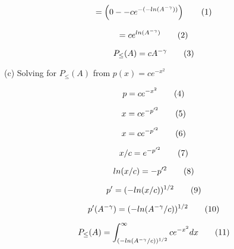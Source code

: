 \[
  =
  \left(
    0
      -
    -ce^{-(-ln(A^{-\gamma}))}
  \right)
  \addtag
\]

\[
  =
  ce^{ln(A^{-\gamma})}
  \addtag
\]

\[
  P_\leq (A)
  =
  cA^{-\gamma}
  \addtag
\]

(c) Solving for
$P_\leq (A)$
from
$p(x) = ce^{-x^2}$

\[
  p = ce^{-x^2}
  \addtag
\]

\[
  x = ce^{-p'^2}
  \addtag
\]

\[
  x = ce^{-p'^2}
  \addtag
\]

\[
  x / c
  =
  e^{-p'^2}
  \addtag
\]

\[
  ln(x / c)
  =
  -p'^2
  \addtag
\]

\[
  p'
  =
  (-ln(x / c))^{1/2}
  \addtag
\]

\[
  p'(A^{-\gamma})
  =
  (-ln(A^{-\gamma} / c))^{1/2}
  \addtag
\]

\[
  P_\leq (A)
  =
  \int_{
    (-ln(A^{-\gamma} / c))^{1/2}
  }^\infty
    ce^{-x^2}
    dx
  \addtag
\]